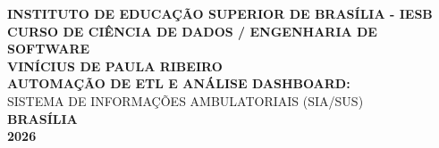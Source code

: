 ﻿\documentclass[12pt,a4paper]{article}
\begin{document}
\begin{titlepage}
    \begin{center}
        \large \textbf{INSTITUTO DE EDUCAÇÃO SUPERIOR DE BRASÍLIA - IESB}\\
        \large \textbf{CURSO DE CIÊNCIA DE DADOS / ENGENHARIA DE SOFTWARE}\\
        \vspace{4cm}
        \Large \textbf{VINÍCIUS DE PAULA RIBEIRO}\\
        \vspace{4cm}
        \LARGE \textbf{AUTOMAÇÃO DE ETL E ANÁLISE DASHBOARD:}\\
        \Large SISTEMA DE INFORMAÇÕES AMBULATORIAIS (SIA/SUS)\\
        \vfill
        \large \textbf{BRASÍLIA}\\
        \large \textbf{2026}
    \end{center}
\end{titlepage}

\tableofcontents
\newpage


\newpage

\newpage

\newpage


\newpage
\printbibliography[title={REFERÊNCIAS BIBLIOGRÁFICAS}]
\end{document}
